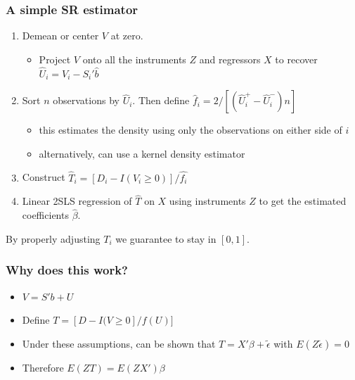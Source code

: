 \documentclass[11pt,dvipsnames,table,aspectratio=169]{beamer}
\begin{document}
\begin{frame}
       \frametitle{A simple SR estimator}
       \begin{enumerate}
       \item Demean or center $V$ at zero. 
       \begin{itemize}
              \item Project $V$ onto all the instruments $Z$ and regressors $X$ to recover $\hat U_i = V_i - S_i'\hat b$  
       \end{itemize}
       \item Sort $n$ observations by $\hat U_i$. Then define $\hat f_i = 2/ \left[(\hat U_i^+ - \hat U_i^-) n \right]$ 
       \begin{itemize}
              \item this estimates the density using only the observations on either side of $i$
              \item alternatively, can use a kernel density estimator
       \end{itemize}
       \item Construct $\hat{T}_i = [D_i -  I(V_i \geq 0)]/ \hat{f_i}$
       \item Linear 2SLS regression of $\hat{T}$ on $X$ using instruments $Z$ to get the estimated coefficients $\hat{\beta}$.
       \end{enumerate}
       By properly adjusting $T_i$ we guarantee to stay in $[0,1]$.
\end{frame}
       
\begin{frame}
       \frametitle{Why does this work?}
       \begin{itemize}
       \item $V = S'b + U$ 
       \item Define $T = [ D - I(V \ge 0 ]/f(U) ] $
       \item Under these assumptions, can be shown that $T = X'\beta + \tilde \epsilon $ with $E(Z \tilde \epsilon) = 0$
       \item Therefore $E(ZT) = E(ZX')\beta$ 
       \end{itemize}
\end{frame}
\end{document}
